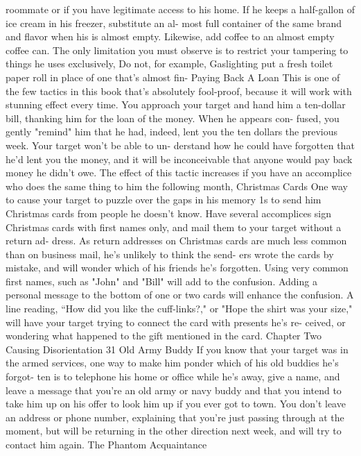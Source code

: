 \documentclass{book}
\begin{document}
roommate or if you have legitimate access to his home. If he 
keeps a half-gallon of ice cream in his freezer, substitute an al- 
most full container of the same brand and flavor when his is 
almost empty. Likewise, add coffee to an almost empty coffee 
can. The only limitation you must observe is to restrict your 
tampering to things he uses exclusively, Do not, for example,  Gaslighting 
put a fresh toilet paper roll in place of one that’s almost fin- 
Paying Back A Loan 
This is one of the few tactics in this book that's absolutely 
fool-proof, because it will work with stunning effect every time. 
You approach your target and hand him a ten-dollar bill, 
thanking him for the loan of the money. When he appears con- 
fused, you gently "remind" him that he had, indeed, lent you the 
ten dollars the previous week. Your target won't be able to un- 
derstand how he could have forgotten that he'd lent you the 
money, and it will be inconceivable that anyone would pay back money he didn't owe. The effect of this tactic increases if 
you have an accomplice who does the same thing to him the 
following month, 
Christmas Cards 
One way to cause your target to puzzle over the gaps in his memory 1s to send him Christmas cards from people he doesn't know. Have several accomplices sign Christmas cards with first names only, and mail them to your target without a return ad- dress. As return addresses on Christmas cards are much less common than on business mail, he's unlikely to think the send- ers wrote the cards by mistake, and will wonder which of his friends he's forgotten. Using very common first names, such as "John" and "Bill" will add to the confusion. 
Adding a personal message to the bottom of one or two cards will enhance the confusion. A line reading, “How did you 
like the cuff-links?," or "Hope the shirt was your size," will have your target trying to connect the card with presents he’s re- ceived, or wondering what happened to the gift mentioned in the card. 
Chapter Two 
Causing Disorientation 
31 
Old Army Buddy 
If you know that your target was in the armed services, one 
way to make him ponder which of his old buddies he’s forgot- 
ten is to telephone his home or office while he's away, give a 
name, and leave a message that you're an old army or navy 
buddy and that you intend to take him up on his offer to look 
him up if you ever got to town. You don't leave an address or 
phone number, explaining that you're just passing through at 
the moment, but will be returning in the other direction next 
week, and will try to contact him again. 
The Phantom Acquaintance 
\end{document}
